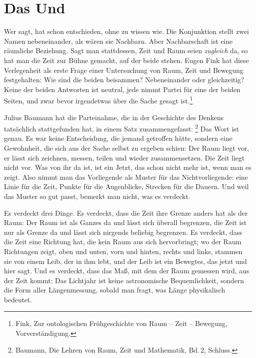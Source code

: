 \chapter{Das Und}

Wer  sagt, hat schon entschieden, ohne zu wissen wie. Die Konjunktion stellt zwei Namen nebeneinander, als wären sie Nachbarn. Aber Nachbarschaft ist eine räumliche Beziehung. Sagt man stattdessen, Zeit und Raum seien \emph{zugleich} da, so hat man die Zeit zur Bühne gemacht, auf der beide stehen. Eugen Fink hat diese Verlegenheit als erste Frage einer Untersuchung von Raum, Zeit und Bewegung festgehalten: Wie sind die beiden beisammen? Nebeneinander oder gleichzeitig? Keine der beiden Antworten ist neutral, jede nimmt Partei für eine der beiden Seiten, und zwar bevor irgendetwas über die Sache gesagt ist.\footnote{Fink, Zur ontologischen Frühgeschichte von Raum -- Zeit -- Bewegung, Vorverständigung.}

Julius Baumann hat die Parteinahme, die in der Geschichte des Denkens tatsächlich stattgefunden hat, in einem Satz zusammengefasst: \footnote{Baumann, Die Lehren von Raum, Zeit und Mathematik, Bd.\,2, Schluss.} Das Wort  ist genau. Es war keine Entscheidung, die jemand getroffen hätte, sondern eine Gewohnheit, die sich aus der Sache selbst zu ergeben schien: Der Raum liegt vor, er lässt sich zeichnen, messen, teilen und wieder zusammensetzen. Die Zeit liegt nicht vor. Was von ihr da ist, ist ein Jetzt, das schon nicht mehr ist, wenn man es zeigt. Also nimmt man das Vorliegende als Muster für das Nichtvorliegende: eine Linie für die Zeit, Punkte für die Augenblicke, Strecken für die Dauern. Und weil das Muster so gut passt, bemerkt man nicht, was es verdeckt.

Es verdeckt drei Dinge. Es verdeckt, dass die Zeit ihre Grenze anders hat als der Raum: Der Raum ist als Ganzes da und lässt sich überall begrenzen, die Zeit ist nur als Grenze da und lässt sich nirgends beliebig begrenzen. Es verdeckt, dass die Zeit eine Richtung hat, die kein Raum aus sich hervorbringt; wo der Raum Richtungen zeigt, oben und unten, vorn und hinten, rechts und links, stammen sie von einem Leib, der in ihm lebt, und der Leib ist ein Bewegtes, das jetzt und hier sagt. Und es verdeckt, dass das Maß, mit dem der Raum gemessen wird, aus der Zeit kommt: Das Lichtjahr ist keine astronomische Bequemlichkeit, sondern die Form aller Längenmessung, sobald man fragt, was Länge physikalisch bedeutet.

